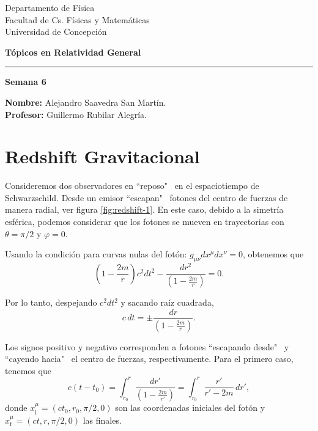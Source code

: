 \documentclass[letterpaper,11pt]{article}
\begin{document}
\pagestyle{plain}

\begin{flushleft}\vspace{-2cm}
Departamento de Física \\
Facultad de Cs. Físicas y Matemáticas\\
Universidad de Concepción
\end{flushleft}

\begin{flushright}\vspace{-1.5cm}
\textbf{Tópicos en Relatividad General} 
\end{flushright}



\rule{\linewidth}{0.1mm}

\begin{center}
\textbf{\LARGE Semana 6}
\end{center}

\begin{flushleft}
\textbf{Nombre:} Alejandro Saavedra San Martín. \\
\textbf{Profesor:} Guillermo Rubilar Alegría.
\end{flushleft}

\section*{Redshift Gravitacional}

Consideremos dos observadores en ``reposo" \ en el espaciotiempo de Schwarzschild. Desde un emisor ``escapan" \ fotones del centro de fuerzas de manera radial, ver figura \ref{fig:redshift-1}. En este caso, debido a la simetría esférica, podemos considerar que los fotones se mueven en trayectorias con $\theta = \pi/2$ y $\varphi = 0$. 

Usando la condición para curvas nulas del fotón: $g_{\mu\nu} dx^{\mu}dx^{\nu} = 0$, obtenemos que
\begin{equation}
\left(1 - \frac{2m}{r}\right) c^2dt^2 - \frac{dr^2}{\left(1 - \frac{2m}{r}\right)} = 0.
\end{equation}  

Por lo tanto, despejando $c^2dt^2$ y sacando raíz cuadrada,
\begin{equation}
c \,dt = \pm \frac{dr}{\left(1 - \frac{2m}{r} \right)}.
\end{equation} 

Los signos positivo y negativo corresponden a fotones ``escapando desde" \ y ``cayendo hacia" \ el centro de fuerzas, respectivamente. Para el primero caso, tenemos que 
\begin{equation}
c(t-t_0) = \int_{r_0}^r \frac{dr'}{\left(1 - \frac{2m}{r'}\right)} = \int_{r_0}^r \frac{r'}{r'-2m} \,dr',
\end{equation}
donde $x_{\text{i}}^{\mu} = (ct_0,r_0,\pi/2,0)$ son las coordenadas iniciales del fotón y $x_{\text{f}}^{\mu} =(ct,r,\pi/2,0)$ las finales. 
\end{document}
